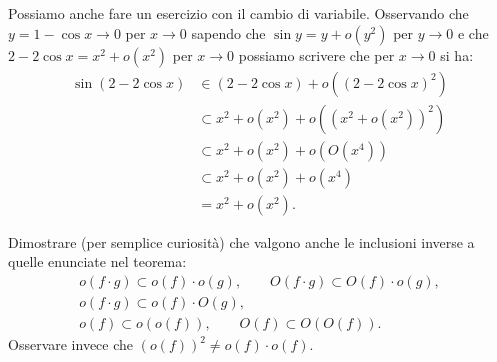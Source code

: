 \begin{example}
Possiamo anche fare un esercizio con il cambio di variabile.
Osservando che $y=1-\cos x\to 0$ per $x\to 0$
sapendo che $\sin y = y + o(y^2)$ per $y\to 0$
e che $2-2\cos x = x^2 + o(x^2)$ per $x\to 0$
possiamo scrivere
che per $x\to 0$ si ha:
\begin{align*}
\sin(2-2\cos x)
& \in (2-2\cos x) + o((2-2\cos x)^2) \\
& \subset x^2 + o(x^2) + o((x^2+o(x^2))^2) \\
& \subset x^2 + o(x^2) + o(O(x^4)) \\
& \subset x^2 + o(x^2) + o(x^4) \\
& = x^2 + o(x^2).
\end{align*}
\end{example}

\begin{exercise}
Dimostrare (per semplice curiosità) che valgono anche le inclusioni inverse a quelle enunciate nel teorema:
\begin{gather*}
o(f\cdot g) \subset o(f) \cdot o(g), \qquad
O(f\cdot g) \subset O(f) \cdot o(g), \\
o(f\cdot g) \subset o(f) \cdot O(g), \\
o(f) \subset o(o(f)),  \qquad
O(f) \subset O(O(f)).
\end{gather*}
Osservare invece che $(o(f))^2 \neq o(f)\cdot o(f)$.
\end{exercise}

